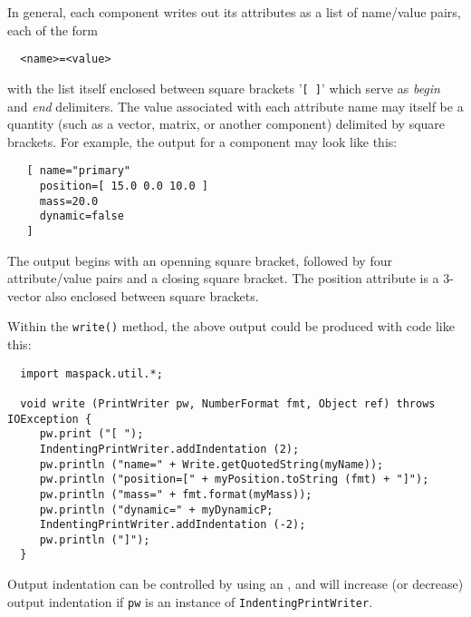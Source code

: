 \documentclass{article}
\begin{document}
In general, each component writes out its attributes as a list
of name/value pairs, each of the form
\begin{lstlisting}
  <name>=<value>
\end{lstlisting}
with the list itself enclosed between square brackets '{\tt [ ]}' which
serve as {\it begin} and {\it end} delimiters. The value associated with each
attribute name may itself be a quantity (such as a vector, matrix, or
another component) delimited by square brackets. For example, the
output for a  component
may look like this:
\begin{lstlisting}
   [ name="primary"
     position=[ 15.0 0.0 10.0 ]
     mass=20.0
     dynamic=false
   ]
\end{lstlisting}
The output begins with an openning square bracket, followed by four
attribute/value pairs and a closing square bracket. The position
attribute is a 3-vector also enclosed between square brackets.

Within the {\tt write()} method, the above output could be produced
with code like this:
\begin{lstlisting}
  import maspack.util.*;

  void write (PrintWriter pw, NumberFormat fmt, Object ref) throws IOException {
     pw.print ("[ ");
     IndentingPrintWriter.addIndentation (2); 
     pw.println ("name=" + Write.getQuotedString(myName));
     pw.println ("position=[" + myPosition.toString (fmt) + "]");
     pw.println ("mass=" + fmt.format(myMass));
     pw.println ("dynamic=" + myDynamicP;
     IndentingPrintWriter.addIndentation (-2);
     pw.println ("]");
  }
\end{lstlisting}
Output indentation can be controlled by using an
, and
will increase (or decrease) output indentation if
{\tt pw} is an instance of {\tt IndentingPrintWriter}.
\end{document}
